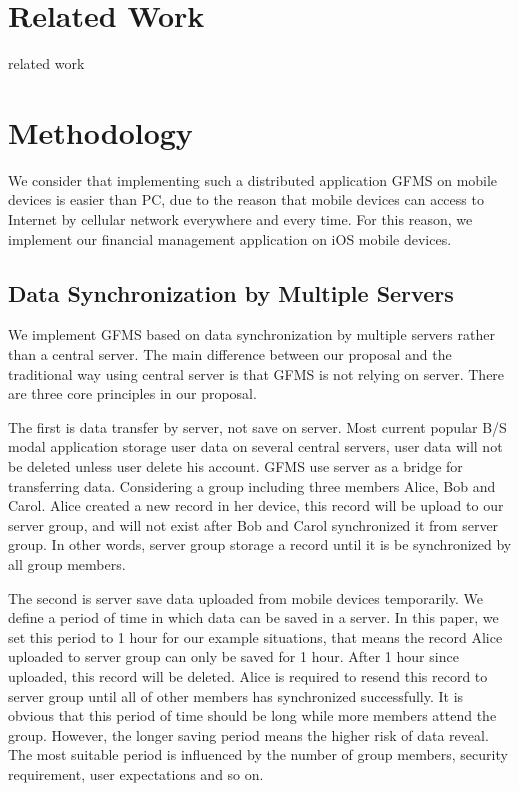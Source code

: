 \documentclass[twocolumn,10pt]{article}
\begin{document}
\section{Related Work}

related work

\section{Methodology}

We consider that implementing such a distributed application GFMS on mobile devices is easier than PC, due to the reason that mobile devices can access to Internet by cellular network everywhere and every time. For this reason, we implement our financial management application on iOS mobile devices. 

\subsection{Data Synchronization by Multiple Servers}

We implement GFMS based on data synchronization by multiple servers rather than a central server. The main difference between our proposal and the traditional way using central server is that GFMS is not relying on server. There are three core principles in our proposal. 

The first is data transfer by server, not save on server. Most current popular B/S modal application storage user data on several central servers, user data will not be deleted unless user delete his account. GFMS use server as a bridge for transferring data. Considering a group including three members Alice, Bob and Carol. Alice created a new record in her device, this record will be upload to our server group, and will not exist after Bob and Carol synchronized it from server group. In other words, server group  storage a record until it is be synchronized by all group members.

The second is server save data uploaded from mobile devices temporarily. We define a period of time in which data can be saved in a server. In this paper, we set this period to 1 hour for our example situations, that means the record Alice uploaded to server group can only be saved for 1 hour. After 1 hour since uploaded, this record will be deleted. Alice is required to resend this record to server group until all of other members has synchronized successfully. It is obvious that this period of time should be long while more members attend the group. However, the longer saving period means the higher risk of data reveal. The most suitable period is influenced by the number of group members, security requirement, user expectations and so on. 
\end{document}
